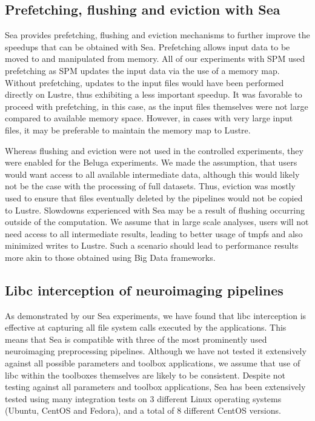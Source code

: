     \subsection{Prefetching, flushing and eviction with Sea}

    Sea provides prefetching, flushing and eviction mechanisms to further
    improve the speedups that can be obtained with Sea. Prefetching allows input
    data to be moved to and manipulated from memory. All of our experiments with
    SPM used prefetching as SPM updates the input data via the use of a memory
    map. Without prefetching, updates to the input files would have been
    performed directly on Lustre, thus exhibiting a less important speedup. It
    was favorable to proceed with prefetching, in this case, as the input files
    themselves were not large compared to available memory space. However, in
    cases with very large input files, it may be preferable to maintain the
    memory map to Lustre.

    Whereas flushing and eviction were not used in the controlled experiments,
    they were enabled for the Beluga experiments. We made the assumption, that 
    users would want access to all available intermediate data,
    although this would likely not be the case with the processing of full datasets.
    Thus, eviction was mostly used to ensure that files eventually deleted by
    the pipelines would not be copied to Lustre.
    Slowdowns experienced with Sea may be a result of flushing
    occurring outside of the computation. We assume that in large scale
    analyses, users will not need access to all intermediate results, leading to
    better usage of tmpfs and also minimized writes to Lustre. Such a scenario
    should lead to performance results more akin to those obtained using Big
    Data frameworks.

    \subsection{Libc interception of neuroimaging pipelines}
    
    As demonstrated by our Sea experiments, we have found that libc interception
    is effective at capturing all file system calls executed by the
    applications. This means that Sea is compatible with three of the most
    prominently used neuroimaging preprocessing pipelines. Although we have not
    tested it extensively against all possible parameters and toolbox
    applications, we assume that use of libc within the toolboxes themselves are
    likely to be consistent. Despite not testing against all parameters and
    toolbox applications, Sea has been extensively tested using many integration
    tests on 3 different Linux operating systems (Ubuntu, CentOS and Fedora),
    and a total of 8 different CentOS versions.

